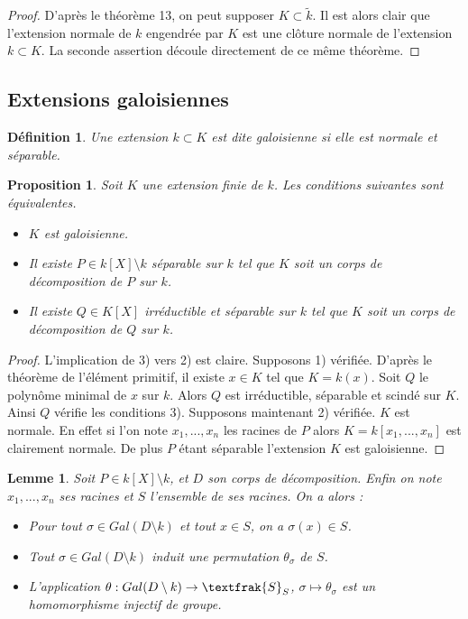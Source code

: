 \documentclass[12pt,a4paper]{report}
\newtheorem{lem}[thm]{\bf Lemme}
\newtheorem{prop}[thm]{\bf Proposition}
\newtheorem{defn}[thm]{\bf D\'efinition}
\begin{document}
\begin{proof}
D'après le théorème 13, on peut supposer $K\subset \tilde{k}$. Il est alors clair que l'extension normale de $k$ engendrée par $K$ est une clôture normale de l'extension $k\subset K$. La seconde assertion découle directement de ce même théorème. 
\end{proof}

   
\subsection{Extensions galoisiennes}

\begin{defn}\rm
Une extension $k \subset K$ est dite galoisienne si elle est normale et séparable. 

\end{defn}

\begin{prop}\rm
Soit $K$ une extension finie de $k$. Les conditions suivantes sont équivalentes. 
\begin{itemize}
\item[1)] $K$ est galoisienne. 
\item[2)] Il existe $P\in k[X]\setminus k$ séparable sur $k$ tel que $K$ soit un corps de décomposition de $P$ sur $k$. 
\item[3)] Il existe $Q \in K[X]$ irréductible et séparable sur $k$ tel que $K$ soit un corps de décomposition de $Q$ sur $k$. 
\end{itemize}

\end{prop}

\begin{proof}
L'implication de 3) vers 2) est claire. Supposons 1) vérifiée. D'après le théorème de l'élément primitif, il existe $x\in K $ tel que $K=k(x)$. Soit $Q $ le polynôme minimal de $x$ sur $k$. Alors $Q$ est irréductible, séparable et scindé sur $K$. Ainsi $Q$ vérifie les conditions 3). Supposons maintenant 2) vérifiée. $K$ est normale. En effet si l'on note $x_1,...,x_n$ les racines de $P$ alors $K=k[x_1,...,x_n]$ est clairement normale. De plus $P$ étant séparable l'extension $K$ est galoisienne.   
\end{proof}
 

\begin{lem}\rm
Soit $P \in  k[X]\setminus k$, et $D$ son corps de décomposition. Enfin on note $x_1,...,x_n$ ses racines et $S$ l'ensemble de ses racines. On a alors : 
\begin{itemize}
\item Pour tout $\sigma \in Gal(D\setminus k)$ et tout $x\in S$, on a $\sigma(x)\in S$.
\item Tout $\sigma \in Gal(D\setminus k)$ induit une permutation $\theta_{\sigma}$ de $S$. 
\item L'application $\theta : Gal(D\setminus k) \rightarrow \textfrak{S}_S$, $\sigma \mapsto \theta_{\sigma}$ est un homomorphisme injectif de groupe. 
\end{itemize}
\end{lem}
\end{document}
